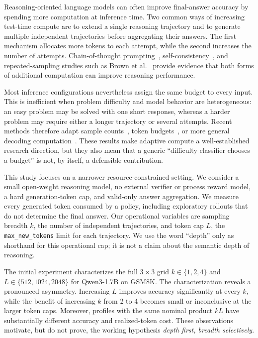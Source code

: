 \documentclass[runningheads]{llncs}
\begin{document}
Reasoning-oriented language models can often improve final-answer accuracy by
spending more computation at inference time. Two common ways of increasing
test-time compute are to extend a single reasoning trajectory and to generate
multiple independent trajectories before aggregating their answers. The first
mechanism allocates more tokens to each attempt, while the second increases the
number of attempts. Chain-of-thought prompting~\cite{wei2022cot},
self-consistency~\cite{wang2023selfconsistency}, and repeated-sampling studies
such as Brown et al.~\cite{brown2024monkeys} provide evidence that both forms
of additional computation can improve reasoning performance.

Most inference configurations nevertheless assign the same budget to every
input. This is inefficient when problem difficulty and model behavior are
heterogeneous: an easy problem may be solved with one short response, whereas
a harder problem may require either a longer trajectory or several attempts.
Recent methods therefore adapt sample counts~\cite{aggarwal2023adaptive,
wang2025penny,wan2025rasc}, token budgets~\cite{han2025token}, or more general
decoding computation~\cite{snell2025scaling,damani2025hard}. These results make
adaptive compute a well-established research direction, but they also mean
that a generic ``difficulty classifier chooses a budget'' is not, by itself,
a defensible contribution.

This study focuses on a narrower resource-constrained setting. We consider a
small open-weight reasoning model, no external verifier or process reward
model, a hard generation-token cap, and valid-only answer aggregation. We
measure every generated token consumed by a policy, including exploratory
rollouts that do not determine the final answer. Our operational variables are
sampling breadth $k$, the number of independent trajectories, and token cap
$L$, the \texttt{max\_new\_tokens} limit for each trajectory. We use the word
``depth'' only as shorthand for this operational cap; it is not a claim about
the semantic depth of reasoning.

The initial experiment characterizes the full $3\times3$ grid
$k\in\{1,2,4\}$ and $L\in\{512,1024,2048\}$ for Qwen3-1.7B on GSM8K.
The characterization reveals a pronounced asymmetry. Increasing $L$ improves
accuracy significantly at every $k$, while the benefit of increasing $k$ from
2 to 4 becomes small or inconclusive at the larger token caps. Moreover,
profiles with the same nominal product $kL$ have substantially different
accuracy and realized-token cost. These observations motivate, but do not
prove, the working hypothesis \emph{depth first, breadth selectively}.
\end{document}
